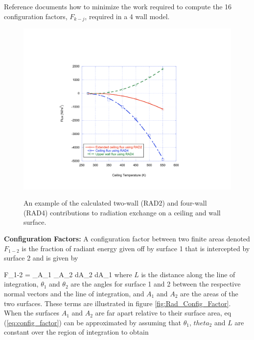Reference \cite{Forney_radiation} documents how to minimize the work required to compute the 16 configuration factors, $F_{k-j}$, required in a 4 wall model.

\begin{figure}
\begin{center}
\includegraphics[width=5.0in]{FIGURES/Theory/Radiation_2vs4}\\
\end{center}
\caption{An example of the calculated two-wall (RAD2) and four-wall (RAD4) contributions to radiation exchange on a ceiling and wall surface.}
 \label{fig:Rad_2vs4}
\end{figure}

{\bf Configuration Factors:}  A configuration factor between two finite areas denoted $F_{1-2}$ is the fraction of radiant energy given off by surface 1 that is intercepted by  surface 2 and is given by

\be F_{1-2} =  \int_{A_1} \int_{A_2}  dA_2 dA_1 \label{eq:config_factor} \ee
where $L$ is the distance along the line of integration,  $\theta_1$ and $\theta_2$ are the angles for surface 1 and 2 between the respective normal vectors and the line of integration, and $A_1$ and $A_2$ are the areas of the two surfaces.  These terms are illustrated in figure \ref{fig:Rad_Config_Factor}.  When the surfaces $A_1$ and $A_2$ are far apart relative to their surface area, eq (\ref{eq:config_factor}) can be approximated by assuming that $\theta_1$, $theta_2$ and $L$ are constant over the region of integration to obtain

